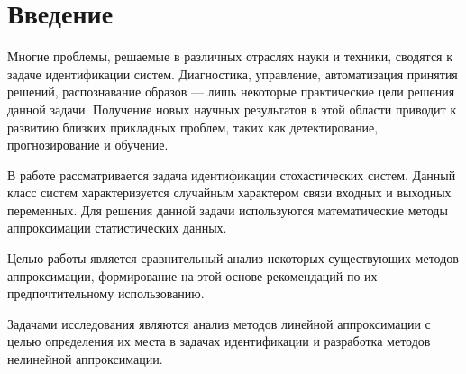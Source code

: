 \chapter*{Введение}

Многие проблемы, решаемые в различных отраслях науки и техники, сводятся к задаче идентификации систем.
Диагностика, управление, автоматизация принятия решений, распознавание образов ---
лишь некоторые практические цели решения данной задачи.
Получение новых научных результатов в этой области приводит к развитию близких прикладных проблем,
таких как детектирование, прогнозирование и обучение.

В работе рассматривается задача идентификации стохастических систем.
Данный класс систем характеризуется случайным характером связи входных и выходных переменных.
Для решения данной задачи используются математические методы аппроксимации статистических данных.

Целью работы является сравнительный анализ некоторых существующих методов аппроксимации,
формирование на этой основе рекомендаций по их предпочтительному использованию.

Задачами исследования являются анализ методов линейной аппроксимации с целью определения их места
в задачах идентификации и разработка методов нелинейной аппроксимации.

